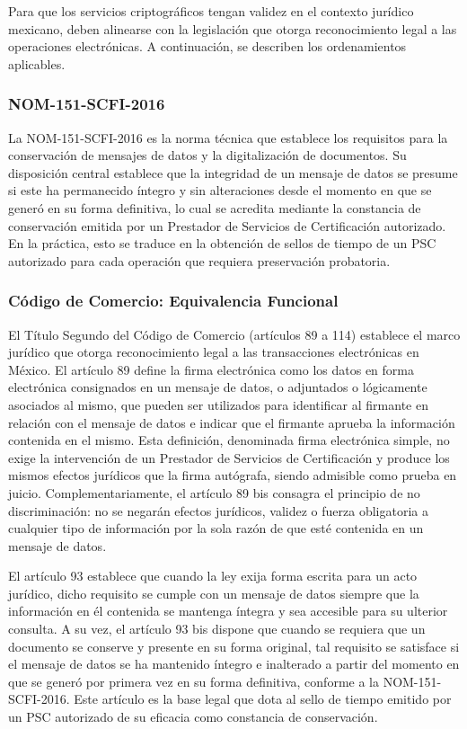 Para que los servicios criptográficos tengan validez en el contexto jurídico mexicano, deben alinearse con la legislación que otorga reconocimiento legal a las operaciones electrónicas. A continuación, se describen los ordenamientos aplicables.

\subsubsection{NOM-151-SCFI-2016}

La NOM-151-SCFI-2016 es la norma técnica que establece los requisitos para la conservación de mensajes de datos y la digitalización de documentos. Su disposición central establece que la integridad de un mensaje de datos se presume si este ha permanecido íntegro y sin alteraciones desde el momento en que se generó en su forma definitiva, lo cual se acredita mediante la constancia de conservación emitida por un Prestador de Servicios de Certificación autorizado. En la práctica, esto se traduce en la obtención de sellos de tiempo de un PSC autorizado para cada operación que requiera preservación probatoria.

\subsubsection{Código de Comercio: Equivalencia Funcional}

El Título Segundo del Código de Comercio (artículos 89 a 114) \cite{ccom2018} establece el marco jurídico que otorga reconocimiento legal a las transacciones electrónicas en México. El artículo 89 define la firma electrónica como los datos en forma electrónica consignados en un mensaje de datos, o adjuntados o lógicamente asociados al mismo, que pueden ser utilizados para identificar al firmante en relación con el mensaje de datos e indicar que el firmante aprueba la información contenida en el mismo. Esta definición, denominada firma electrónica simple, no exige la intervención de un Prestador de Servicios de Certificación y produce los mismos efectos jurídicos que la firma autógrafa, siendo admisible como prueba en juicio. Complementariamente, el artículo 89 bis consagra el principio de no discriminación: no se negarán efectos jurídicos, validez o fuerza obligatoria a cualquier tipo de información por la sola razón de que esté contenida en un mensaje de datos.

El artículo 93 establece que cuando la ley exija forma escrita para un acto jurídico, dicho requisito se cumple con un mensaje de datos siempre que la información en él contenida se mantenga íntegra y sea accesible para su ulterior consulta. A su vez, el artículo 93 bis dispone que cuando se requiera que un documento se conserve y presente en su forma original, tal requisito se satisface si el mensaje de datos se ha mantenido íntegro e inalterado a partir del momento en que se generó por primera vez en su forma definitiva, conforme a la NOM-151-SCFI-2016. Este artículo es la base legal que dota al sello de tiempo emitido por un PSC autorizado de su eficacia como constancia de conservación.

